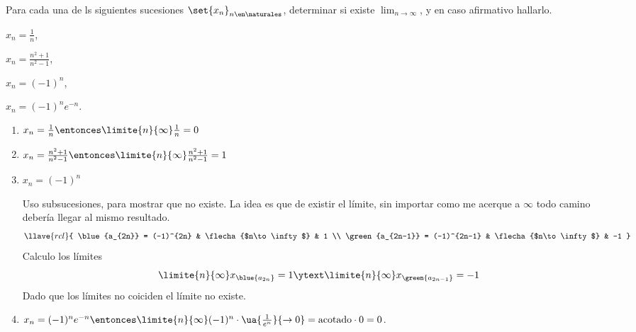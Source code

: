 \begin{enunciado}{\ejercicio}
  Para cada una de ls siguientes sucesiones $\set{x_n}_{n \en \naturales}$, determinar si existe
  $\lim_{n\to \infty}$, y en caso afirmativo hallarlo.
  \begin{enumerate}[label=\alph*)]
    \begin{multicols}{2}
      \item $x_n = \frac{1}{n}$,
      \item $x_n = \frac{n^2 + 1}{n^2 - 1}$,
      \item $x_n = (-1)^n$,
      \item $x_n = (-1)^n e^{-n}$.
    \end{multicols}
  \end{enumerate}
\end{enunciado}

{\huge{}}
\begin{enumerate}[label=\alph*)]
  \item $x_n = \frac{1}{n}
          \entonces
          \limite{n}{\infty} \frac{1}{n} = 0
        $

  \item $x_n = \frac{n^2 + 1}{n^2 - 1}
          \entonces
          \limite{n}{\infty} \frac{n^2 + 1}{n^2 - 1} = 1
        $

  \item\label{ej12-item-c} $x_n = (-1)^n$

        Uso subsucesiones, para mostrar que no existe. La idea es que de existir el límite, sin importar como me acerque a $\infty$ todo
        camino debería llegar al mismo resultado.
        $$
          \llave{rcl}{
            \blue{a_{2n}} = (-1)^{2n} & \flecha{$n\to \infty$} & 1 \\
            \green{a_{2n-1}} = (-1)^{2n-1} & \flecha{$n\to \infty$} & -1
          }
        $$
        Calculo los límites
        $$
          \limite{n}{\infty} x_{\blue{a_{2n}}} = 1
          \ytext
          \limite{n}{\infty} x_{\green{a_{2n-1}}} = -1
        $$
        Dado que los límites no coiciden el límite no existe.

  \item $x_n = (-1)^n e^{-n}
          \entonces
          \limite{n}{\infty} (-1)^n \cdot \ua{\frac{1}{e^n}}{\to 0} = \text{acotado} \cdot 0 = 0 $.
\end{enumerate}

\begin{aportes}
  \item {}
\end{aportes}

